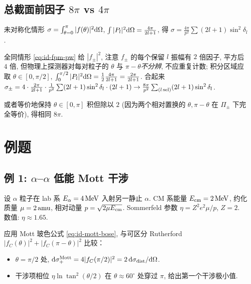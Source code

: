 \subsection{总截面前因子 $8\pi$ vs $4\pi$}\label{sec:id-proof-prefactor}

\begin{proof*}[证明思路]
未对称化情形 $\sigma=\int_{\theta=0}^{\pi}|f(\theta)|^2 \mathrm{d}\Omega$, $\int |P_l|^2 \mathrm{d}\Omega=\frac{4\pi}{2l+1}$, 得 $\sigma=\frac{4\pi}{p^2}\sum(2l+1)\sin^2\delta_l$.

全同情形 \eqref{eq:id-fpm-pw} 给 $|f_\pm|^2$, 注意 $f_\pm$ 的每个保留 $l$ 振幅有 $2$ 倍因子, 平方后 $4$ 倍, 但物理上探测器对每对粒子的 $\theta$ 与 $\pi-\theta$\emph{不分辨}, 不应重复计数; 积分区域应取 $\theta\in[0,\pi/2]$, $\int_0^{\pi/2}|P_l|^2\mathrm{d}\Omega=\frac{1}{2}\frac{4\pi}{2l+1}=\frac{2\pi}{2l+1}$. 合起来 $\sigma_\pm=4\cdot\frac{2\pi}{2l+1}\cdot\frac{1}{p^2}\sum(2l+1)\sin^2\delta_l\cdot(2l+1)\to\frac{8\pi}{p^2}\sum_{(l\,{\rm sel})}(2l+1)\sin^2\delta_l$.

或者等价地保持 $\theta\in[0,\pi]$ 积但除以 $2$ (因为两个相对置换的 $\theta,\pi-\theta$ 在 $\Pi_\pm$ 下完全等价), 得相同 $8\pi$.\hfill
\end{proof*}

\section{例题}\label{sec:id-examples}

\subsection{例 1: $\alpha$--$\alpha$ 低能 Mott 干涉}\label{sec:id-ex-alpha}

设 $\alpha$ 粒子在 lab 系 $E_\alpha=4\,\rm MeV$ 入射另一静止 $\alpha$. CM 系能量 $E_{\rm cm}=2\,\rm MeV$, 约化质量 $\mu=2\,{\rm amu}$, 相对动量 $p=\sqrt{2\mu E_{\rm cm}}$. Sommerfeld 参数 $\eta=Z^2 e^2\mu/p$, $Z=2$. 数值: $\eta\approx 1.65$.

应用 Mott 玻色公式 \eqref{eq:id-mott-bose}, 与可区分 Rutherford $|f_C(\theta)|^2+|f_C(\pi-\theta)|^2$ 比较：

\begin{itemize}
  \item $\theta=\pi/2$ 处, $\mathrm{d}\sigma_+^{\rm Mott}=4|f_C(\pi/2)|^2=2\,\mathrm{d}\sigma_{\rm dist}/\mathrm{d}\Omega$.
  \item 干涉项相位 $\eta\ln\tan^2(\theta/2)$ 在 $\theta\approx 60^\circ$ 处穿过 $\pi$, 给出第一个干涉极小值.
\end{itemize}

